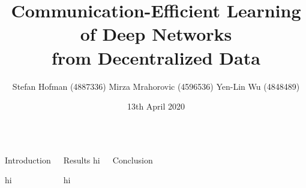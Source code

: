 \documentclass{poster_sefim}
\title{Communication-Efficient Learning of Deep Networks \\from Decentralized Data}
\author{Stefan Hofman (4887336)
Mirza Mrahorovic (4596536)
Yen-Lin Wu (4848489)}
\institute{Delft University of Technology}
\date{13th April 2020}
\begin{document}
    \begin{frame}{} 
        \titlebox
        \vspace{0.7cm}
    \begin{columns} 
    
    
    \begin{columnbox} 
        \begin{block}{\Large Introduction}
            
            hi
        \end{block}
        
        
        
    \end{columnbox} 
    
    \begin{columnbox} 
        \begin{block}{\Large Results}
            hi
        \end{block} 
        hi
    \end{columnbox} 
    
    \begin{columnbox} 
        \begin{block}{\Large Conclusion}
            
        \end{block}
        
        
    \end{columnbox}

    \end{columns} 
    
    \end{frame}
\end{document}
